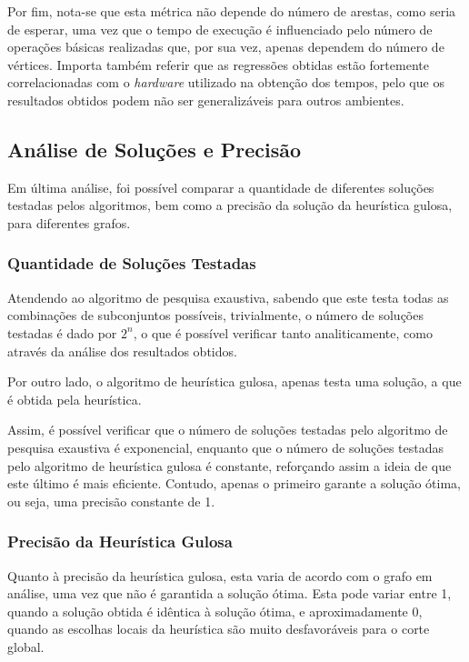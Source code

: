 \documentclass[mirror]{revdetua}
\begin{document}
Por fim, nota-se que esta métrica não depende do número de arestas, como seria de esperar, uma vez que o tempo de execução é influenciado pelo número de operações básicas realizadas que, por sua vez, apenas dependem do número de vértices. Importa também referir que as regressões obtidas estão fortemente correlacionadas com o \textit{hardware} utilizado na obtenção dos tempos, pelo que os resultados obtidos podem não ser generalizáveis para outros ambientes.

\subsection{Análise de Soluções e Precisão}

Em última análise, foi possível comparar a quantidade de diferentes soluções testadas pelos algoritmos, bem como a precisão da solução da heurística gulosa, para diferentes grafos.

\subsubsection{Quantidade de Soluções Testadas}

Atendendo ao algoritmo de pesquisa exaustiva, sabendo que este testa todas as combinações de subconjuntos possíveis, trivialmente, o número de soluções testadas é dado por $2^n$, o que é possível verificar tanto analiticamente, como através da análise dos resultados obtidos.

Por outro lado, o algoritmo de heurística gulosa, apenas testa uma solução, a que é obtida pela heurística.

Assim, é possível verificar que o número de soluções testadas pelo algoritmo de pesquisa exaustiva é exponencial, enquanto que o número de soluções testadas pelo algoritmo de heurística gulosa é constante, reforçando assim a ideia de que este último é mais eficiente. Contudo, apenas o primeiro garante a solução ótima, ou seja, uma precisão constante de 1.

\subsubsection{Precisão da Heurística Gulosa}

Quanto à precisão da heurística gulosa, esta varia de acordo com o grafo em análise, uma vez que não é garantida a solução ótima. Esta pode variar entre 1, quando a solução obtida é idêntica à solução ótima, e aproximadamente 0, quando as escolhas locais da heurística são muito desfavoráveis para o corte global.
\end{document}
